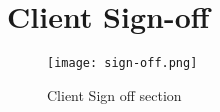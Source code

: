 \chapter{Client Sign-off}
\label{appendix:client-sign-off}

\begin{figure}[!hbt]
  	\centering
 	\texttt{[image: sign-off.png]}
 	\caption{Client Sign off section}
\end{figure}